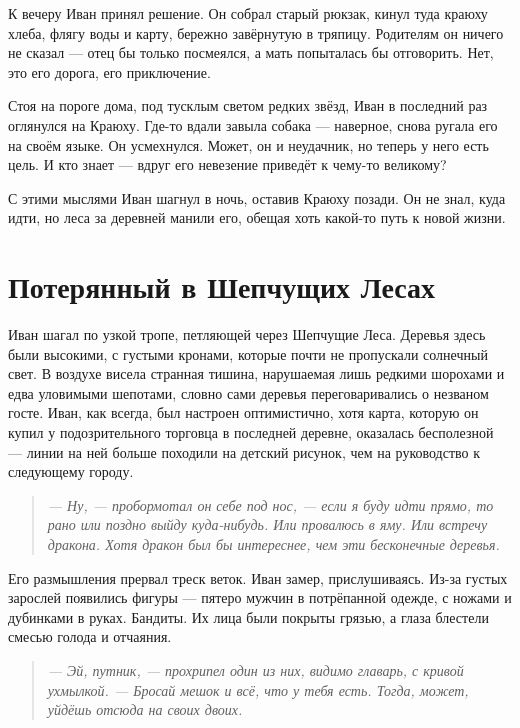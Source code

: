 \documentclass[12pt,a4paper]{book} %
\newenvironment{dialogue}{\begin{quote}\itshape}{\end{quote}}
\begin{document}
К вечеру Иван принял решение. Он собрал старый рюкзак, кинул туда краюху хлеба, флягу воды и карту, бережно завёрнутую в тряпицу. Родителям он ничего не сказал --- отец бы только посмеялся, а мать попыталась бы отговорить. Нет, это его дорога, его приключение.

Стоя на пороге дома, под тусклым светом редких звёзд, Иван в последний раз оглянулся на Краюху. Где-то вдали завыла собака --- наверное, снова ругала его на своём языке. Он усмехнулся. Может, он и неудачник, но теперь у него есть цель. И кто знает --- вдруг его невезение приведёт к чему-то великому?

С этими мыслями Иван шагнул в ночь, оставив Краюху позади. Он не знал, куда идти, но леса за деревней манили его, обещая хоть какой-то путь к новой жизни.

\chapter{Потерянный в Шепчущих Лесах}

Иван шагал по узкой тропе, петляющей через Шепчущие Леса. Деревья здесь были высокими, с густыми кронами, которые почти не пропускали солнечный свет. В воздухе висела странная тишина, нарушаемая лишь редкими шорохами и едва уловимыми шепотами, словно сами деревья переговаривались о незваном госте. Иван, как всегда, был настроен оптимистично, хотя карта, которую он купил у подозрительного торговца в последней деревне, оказалась бесполезной --- линии на ней больше походили на детский рисунок, чем на руководство к следующему городу.

\begin{dialogue}
--- Ну, --- пробормотал он себе под нос, --- если я буду идти прямо, то рано или поздно выйду куда-нибудь. Или провалюсь в яму. Или встречу дракона. Хотя дракон был бы интереснее, чем эти бесконечные деревья.
\end{dialogue}

Его размышления прервал треск веток. Иван замер, прислушиваясь. Из-за густых зарослей появились фигуры --- пятеро мужчин в потрёпанной одежде, с ножами и дубинками в руках. Бандиты. Их лица были покрыты грязью, а глаза блестели смесью голода и отчаяния.

\begin{dialogue}
--- Эй, путник, --- прохрипел один из них, видимо главарь, с кривой ухмылкой. --- Бросай мешок и всё, что у тебя есть. Тогда, может, уйдёшь отсюда на своих двоих.
\end{dialogue}
\end{document}
